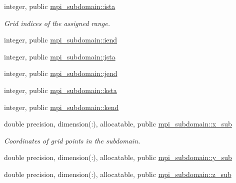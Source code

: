\textbf{ }\par
\begin{DoxyCompactItemize}
\item 
integer, public \hyperlink{namespacempi__subdomain_ab8925faaa6f45326c1d11efa37e03566}{mpi\+\_\+subdomain\+::ista}
\begin{DoxyCompactList}\small\item\em Grid indices of the assigned range. \end{DoxyCompactList}\item 
integer, public \hyperlink{namespacempi__subdomain_abbd7d35107c53bcfd2b2b52771f4aa67}{mpi\+\_\+subdomain\+::iend}
\item 
integer, public \hyperlink{namespacempi__subdomain_ac85bfba1caf77f9c3c0047fe9450fee6}{mpi\+\_\+subdomain\+::jsta}
\item 
integer, public \hyperlink{namespacempi__subdomain_a06433a0d1a081c51202a0010c21c9d36}{mpi\+\_\+subdomain\+::jend}
\item 
integer, public \hyperlink{namespacempi__subdomain_acd499eb1d07159aa9f5c878f9519b00f}{mpi\+\_\+subdomain\+::ksta}
\item 
integer, public \hyperlink{namespacempi__subdomain_af9934313b1ccbcb09f30916df3326076}{mpi\+\_\+subdomain\+::kend}
\end{DoxyCompactItemize}

\textbf{ }\par
\begin{DoxyCompactItemize}
\item 
double precision, dimension(\+:), allocatable, public \hyperlink{namespacempi__subdomain_a978554e1520c79471ef3793ed1872b37}{mpi\+\_\+subdomain\+::x\+\_\+sub}
\begin{DoxyCompactList}\small\item\em Coordinates of grid points in the subdomain. \end{DoxyCompactList}\item 
double precision, dimension(\+:), allocatable, public \hyperlink{namespacempi__subdomain_a58b09abee5f1002de7b20b1b86f5c821}{mpi\+\_\+subdomain\+::y\+\_\+sub}
\item 
double precision, dimension(\+:), allocatable, public \hyperlink{namespacempi__subdomain_aab6d78e49471a9a3db5ad9df4c3d4041}{mpi\+\_\+subdomain\+::z\+\_\+sub}
\end{DoxyCompactItemize}

